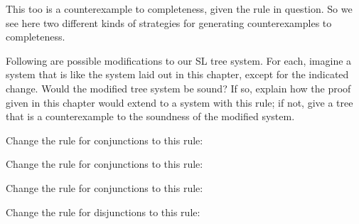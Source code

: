 This too is a counterexample to completeness, given the rule in question. So we see here two different kinds of strategies for generating counterexamples to completeness.

\iffalse

\practiceproblems

\solutions
\problempart
\label{pr.SL.soundness-resolutions}
Following are possible modifications to our SL tree system. For each, imagine a system that is like the system laid out in this chapter, except for the indicated change. Would the modified tree system be sound? If so, explain how the proof given in this chapter would extend to a system with this rule; if not, give a tree that is a counterexample to the soundness of the modified system.
\begin{earg}
\item Change the rule for conjunctions to this rule:

\item Change the rule for conjunctions to this rule:

\item Change the rule for conjunctions to this rule:

\item Change the rule for disjunctions to this rule:


\end{earg}
